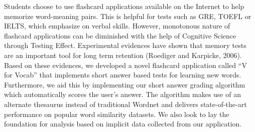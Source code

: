 Students choose to use flashcard applications available on the Internet to help memorize word-meaning pairs. This is helpful for tests such as GRE, TOEFL or IELTS, which emphasize on verbal skills. However, monotonous nature of flashcard applications can be diminished with the help of Cognitive Science through Testing Effect. Experimental evidences have shown that memory tests are an important tool for long term retention (Roediger and Karpicke, 2006). Based on these evidences, we developed a novel flashcard application called ``V for Vocab'' that implements short answer based tests for learning new words. Furthermore, we aid this by implementing our short answer grading algorithm which automatically scores the user's answer. The algorithm makes use of an alternate thesaurus instead of traditional Wordnet and delivers state-of-the-art performance on popular word similarity datasets. We also look to lay the foundation for analysis based on implicit data collected from our application.
